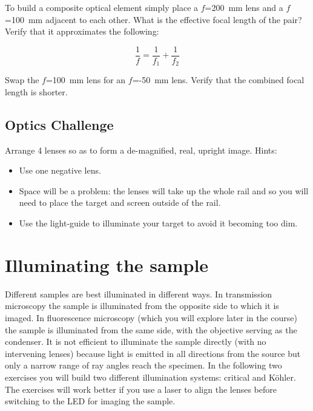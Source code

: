 \documentclass[a4paper]{report}
\begin{document}
To build a composite optical element simply place a $f$=200~mm lens and a
$f$=100~mm adjacent to each other. What is the effective focal length
of the pair? Verify that it approximates the following:

\begin{equation}
\frac{1}{f}=\frac{1}{f_1}+\frac{1}{f_2}
\label{eq:beamFocalLength}
\end{equation}

\noindent
Swap the $f$=100~mm lens for an $f$=-50~mm lens. Verify that the
combined focal length is shorter.

\subsection{Optics Challenge}
Arrange 4 lenses so as to form a de-magnified, real, upright
image. Hints: 
\begin{itemize}
\item Use one negative lens.
\item Space will be a problem: the lenses will take up the whole rail
  and so you will need to place the target and screen outside of the
  rail. 
\item Use the light-guide to illuminate your target to avoid it
  becoming too dim. 
\end{itemize}


\clearpage
\section{Illuminating the sample}
Different samples are best illuminated in different ways. In transmission
microscopy the sample is illuminated from the opposite side to which
it is imaged. In fluorescence microscopy (which you will explore later
in the course) the sample is illuminated from the same side, with the
objective serving as the condenser. It is not efficient to illuminate
the sample directly (with no intervening lenses) because light is
emitted in all directions from the source but only a narrow range of
ray angles reach the specimen. In the following two exercises you will
build two different illumination systems: critical and K\"{o}hler. The
exercises will work better if you use a laser to align the lenses
before switching to the LED for imaging the sample. 
\end{document}
